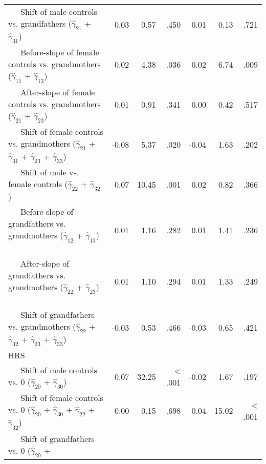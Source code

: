 \documentclass[
  english,
  man, noextraspace]{apa7}
\newenvironment{lltable}{\begin{landscape}\begin{center}\begin{ThreePartTable}}{\end{ThreePartTable}\end{center}\end{landscape}}
\begin{document}
\begin{lltable}
{\begin{longtable}{lrrrrrr}
\ \ \ Shift of male controls vs. grandfathers 
                              ($\hat{\gamma}_{21}$ + $\hat{\gamma}_{31}$) \textcolor{white}{L} & 0.03 & 0.57 & .450 & 0.01 & 0.13 & .721\\
\ \ \ Before-slope of female controls vs. grandmothers 
                              ($\hat{\gamma}_{11}$ + $\hat{\gamma}_{13}$) \textcolor{white}{L} & 0.02 & 4.38 & .036 & 0.02 & 6.74 & .009\\
\ \ \ After-slope of female controls vs. grandmothers 
                              ($\hat{\gamma}_{21}$ + $\hat{\gamma}_{23}$) \textcolor{white}{L} & 0.01 & 0.91 & .341 & 0.00 & 0.42 & .517\\
\ \ \ Shift of female controls vs. grandmothers 
                              ($\hat{\gamma}_{21}$ + $\hat{\gamma}_{31}$ + 
                              $\hat{\gamma}_{23}$ + $\hat{\gamma}_{33}$) \textcolor{white}{L} & -0.08 & 5.37 & .020 & -0.04 & 1.63 & .202\\
\ \ \ Shift of male vs. female controls 
                              ($\hat{\gamma}_{22}$ + $\hat{\gamma}_{32}$) \textcolor{white}{L} & 0.07 & 10.45 & .001 & 0.02 & 0.82 & .366\\
\ \ \ Before-slope of grandfathers vs. grandmothers 
                              ($\hat{\gamma}_{12}$ + $\hat{\gamma}_{13}$) \textcolor{white}{L} & 0.01 & 1.16 & .282 & 0.01 & 1.41 & .236\\
\ \ \ After-slope of grandfathers vs. grandmothers 
                              ($\hat{\gamma}_{22}$ + $\hat{\gamma}_{23}$) \textcolor{white}{L} & 0.01 & 1.10 & .294 & 0.01 & 1.33 & .249\\
\ \ \ Shift of grandfathers vs. grandmothers 
                              ($\hat{\gamma}_{22}$ + $\hat{\gamma}_{32}$ + 
                              $\hat{\gamma}_{23}$ + $\hat{\gamma}_{33}$) \textcolor{white}{L} & -0.03 & 0.53 & .466 & -0.03 & 0.65 & .421\\
HRS &  &  &  &  &  & \\
\ \ \ Shift of male controls vs. 0 ($\hat{\gamma}_{20}$ + 
                              $\hat{\gamma}_{30}$) \textcolor{white}{H} & 0.07 & 32.25 & < .001 & -0.02 & 1.67 & .197\\
\ \ \ Shift of female controls vs. 0 ($\hat{\gamma}_{20}$ + 
                              $\hat{\gamma}_{30}$ + $\hat{\gamma}_{22}$ + 
                              $\hat{\gamma}_{32}$) \textcolor{white}{H} & 0.00 & 0.15 & .698 & 0.04 & 15.02 & < .001\\
\ \ \ Shift of grandfathers vs. 0 ($\hat{\gamma}_{20}$ + 

\end{longtable}}
\end{lltable}
\end{document}
